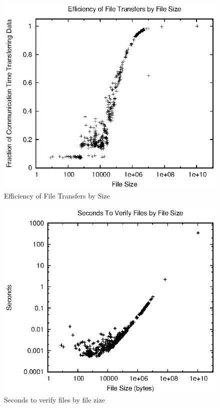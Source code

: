 \begin{figure}[!ht]
\includegraphics[width=\linewidth]{fig7.eps}
\caption{Efficiency of File Transfers by Size}
\label{fig7}
\end{figure}

\begin{figure}[!ht]
\includegraphics[width=\linewidth]{fig8.eps}
\caption{Seconds to verify files by file zize}
\label{fig8}
\end{figure}
